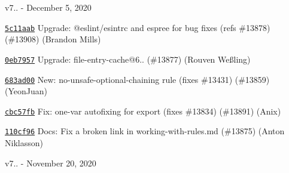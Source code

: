 v7.. -\/ December 5, 2020


\begin{DoxyItemize}
\item \href{https://github.com/eslint/eslint/commit/5c11aabbe8249aeb8cad29bc6a33fc20c8c683ef}{\texttt{ {\ttfamily 5c11aab}}} Upgrade\+: @eslint/esintrc and espree for bug fixes (refs \#13878) (\#13908) (Brandon Mills)
\item \href{https://github.com/eslint/eslint/commit/0eb7957e27fd521317bd5c8479ce7abc1399169c}{\texttt{ {\ttfamily 0eb7957}}} Upgrade\+: file-\/entry-\/cache@6.. (\#13877) (Rouven Weßling)
\item \href{https://github.com/eslint/eslint/commit/683ad00c41e1ae4d889deff82b2a94318e8c2129}{\texttt{ {\ttfamily 683ad00}}} New\+: no-\/unsafe-\/optional-\/chaining rule (fixes \#13431) (\#13859) (Yeon\+Juan)
\item \href{https://github.com/eslint/eslint/commit/cbc57fb7d07c00663ed5781f5e6bc8f534cc2d76}{\texttt{ {\ttfamily cbc57fb}}} Fix\+: one-\/var autofixing for export (fixes \#13834) (\#13891) (Anix)
\item \href{https://github.com/eslint/eslint/commit/110cf962d05625a8a1bf7b5f4ec2194db150eb32}{\texttt{ {\ttfamily 110cf96}}} Docs\+: Fix a broken link in working-\/with-\/rules.\+md (\#13875) (Anton Niklasson)
\end{DoxyItemize}

v7.. -\/ November 20, 2020


